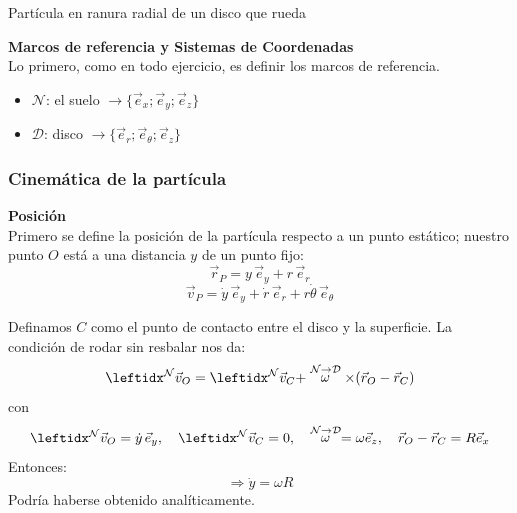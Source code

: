 \begin{solucion}{Partícula en ranura radial de un disco que rueda}

\textbf{Marcos de referencia y Sistemas de Coordenadas}\\
Lo primero, como en todo ejercicio, es definir los marcos de referencia.
\begin{itemize}
    \item $\mathcal{N}$: el suelo $\longrightarrow\{\vec{e}_x;\vec{e}_y;\vec{e}_z\}$
    \item $\mathcal{D}$: disco $\longrightarrow\{\vec{e}_r;\vec{e}_\theta;\vec{e}_z\}$
\end{itemize}

\begin{center}
\end{center}

\subsubsection*{Cinemática de la partícula}
\textbf{Posición}\\
Primero se define la posición de la partícula respecto a un punto estático; nuestro punto $O$ está a una distancia $y$ de un punto fijo:
$$ \vec{r}_P = y\,\vec{e}_y + r\,\vec{e}_r $$
$$ \vec{v}_P = \dot{y}\,\vec{e}_y + \dot{r}\,\vec{e}_r + r\dot{\theta}\,\vec{e}_\theta $$

Definamos $C$ como el punto de contacto entre el disco y la superficie. La condición de rodar sin resbalar nos da:
$$ \marc{\vec{v}_O}{N} = \marc{\vec{v}_C}{N} + \velang{N}{D} \times (\vec{r}_O - \vec{r}_C) $$
con
$$ \marc{\vec{v}_O}{N} = \dot{y}\,\vec{e}_y,
\quad \marc{\vec{v}_C}{N} = 0,
\quad \velang{N}{D} = \omega \vec{e}_z,
\quad \vec{r}_O - \vec{r}_C = R \vec{e}_x $$
Entonces:
$$ \Rightarrow \dot{y} = \omega R $$
Podría haberse obtenido analíticamente.


\end{solucion}
